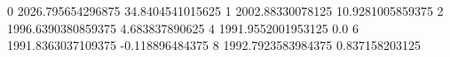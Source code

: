 0 2026.795654296875 34.8404541015625
1 2002.88330078125 10.9281005859375
2 1996.6390380859375 4.683837890625
4 1991.9552001953125 0.0
6 1991.8363037109375 -0.118896484375
8 1992.7923583984375 0.837158203125
